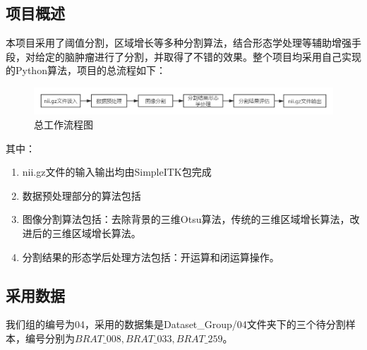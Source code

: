 \documentclass[UTF8]{ctexart}
\begin{document}
\subsection{项目概述}
本项目采用了阈值分割，区域增长等多种分割算法，结合形态学处理等辅助增强手段，对给定的脑肿瘤进行了分割，并取得了不错的效果。整个项目均采用自己实现的Python算法，项目的总流程如下：
\begin{figure}[H]
    \centering  %
    \includegraphics[width=\textwidth]{figure/workflow.png}
    \caption{总工作流程图}
\end{figure}
其中：
\begin{enumerate}[1)]
    \item nii.gz文件的输入输出均由SimpleITK包完成
    \item 数据预处理部分的算法包括 %
    \item 图像分割算法包括：去除背景的三维Otsu算法，传统的三维区域增长算法，改进后的三维区域增长算法。
    \item 分割结果的形态学后处理方法包括：开运算和闭运算操作。
\end{enumerate}

\subsection{采用数据}
我们组的编号为04，采用的数据集是Dataset\_Group/04文件夹下的三个待分割样本，编号分别为$BRAT\_008,BRAT\_033,BRAT\_259$。
\end{document}
